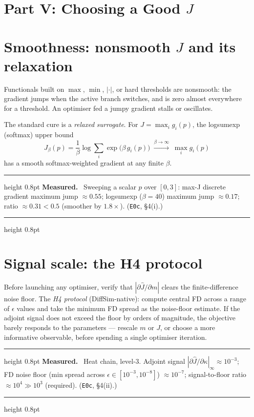 \documentclass[11pt]{article}
\newenvironment{measured}{%
  \par\medskip\noindent\begin{minipage}{\linewidth}
  \hrule height 0.8pt \smallskip
  \textbf{Measured.}\ }{%
  \smallskip\hrule height 0.8pt \end{minipage}\par\medskip}
\begin{document}
\section*{Part V: Choosing a Good $J$}

\section{Smoothness: nonsmooth $J$ and its relaxation}
\label{sec:smoothness}

Functionals built on $\max$, $\min$, $|\cdot|$, or hard thresholds are
nonsmooth: the gradient jumps when the active branch switches, and is
zero almost everywhere for a threshold.  An optimiser fed a jumpy
gradient stalls or oscillates.

The standard cure is a \emph{relaxed surrogate}.  For
$J = \max_i g_i(p)$, the logsumexp (softmax) upper bound
\begin{equation}
  J_\beta(p) = \frac{1}{\beta}\log\sum_i \exp\!\bigl(\beta\, g_i(p)\bigr)
  \;\xrightarrow{\beta\to\infty}\; \max_i g_i(p)
  \label{eq:lse}
\end{equation}
has a smooth softmax-weighted gradient at any finite $\beta$.

\begin{measured}
Sweeping a scalar $p$ over $[0,3]$: max-J discrete gradient maximum jump
$\approx 0.55$; logsumexp ($\beta = 40$) maximum jump $\approx 0.17$;
ratio $\approx 0.31 < 0.5$ (smoother by $1.8\times$).
(\texttt{E0c}, \S4(i).)
\end{measured}

\section{Signal scale: the H4 protocol}
\label{sec:signalscale}

Before launching any optimiser, verify that $|\partial \hat{J}/\partial m|$
clears the finite-difference noise floor.  The \emph{H4 protocol}
(DiffSim-native): compute central FD across a range of $\epsilon$ values
and take the minimum FD spread as the noise-floor estimate.  If the adjoint
signal does not exceed the floor by orders of magnitude, the objective
barely responds to the parameters --- rescale $m$ or $J$, or choose a
more informative observable, before spending a single optimiser iteration.

\begin{measured}
Heat chain, level-3.  Adjoint signal $|\partial \hat{J}/\partial \kappa|_\infty
\approx 10^{-3}$; FD noise floor (min spread across $\epsilon \in
[10^{-3}, 10^{-8}]$) $\approx 10^{-7}$; signal-to-floor ratio
$\approx 10^4 \gg 10^3$ (required).
(\texttt{E0c}, \S4(ii).)
\end{measured}
\end{document}
